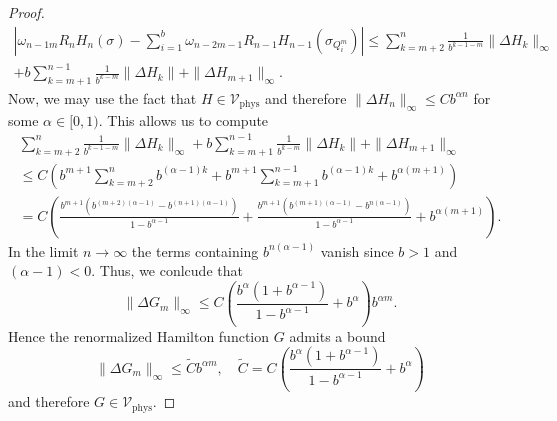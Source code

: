 \documentclass{article}
\newcommand{\phys}{\mathrm{phys}}
\begin{document}
\begin{proof}
    \begin{align}
        \left|\omega_{n-1m}R_nH_n(\sigma)-\sum_{i=1}^b\omega_{n-2m-1}R_{n-1}H_{n-1}(\sigma_{Q_i^m})\right|\leq\sum_{k=m+2}^n\frac{1}{b^{k-1-m}}\|\Delta H_k\|_\infty\nonumber\\+b\sum_{k=m+1}^{n-1}\frac{1}{b^{k-m}}\|\Delta H_k\|
        +\|\Delta H_{m+1}\|_\infty.
    \end{align}
    Now, we may use the fact that $H\in\mathcal{V}_\phys$ and therefore $\|\Delta H_n\|_\infty\leq Cb^{\alpha n}$ for some $\alpha\in[0,1)$. This allows us to compute
    \begin{align}
        \sum_{k=m+2}^n\frac{1}{b^{k-1-m}}\|\Delta H_k\|_\infty+b\sum_{k=m+1}^{n-1}\frac{1}{b^{k-m}}\|\Delta H_k\|
        +\|\Delta H_{m+1}\|_\infty\nonumber\\
        \leq C\left(b^{m+1}\sum_{k=m+2}^nb^{(\alpha-1)k}+b^{m+1}\sum_{k=m+1}^{n-1}b^{(\alpha-1)k}+b^{\alpha(m+1)}\right)\nonumber\\
        =C\left(\frac{b^{m+1}\left(b^{(m+2)(\alpha-1)}-b^{(n+1)(\alpha-1)}\right)}{1-b^{\alpha-1}}+\frac{b^{m+1}\left(b^{(m+1)(\alpha-1)}-b^{n(\alpha-1)}\right)}{1-b^{\alpha-1}}+b^{\alpha(m+1)}\right).
    \end{align}
    In the limit $n\to\infty$ the terms containing $b^{n(\alpha-1)}$ vanish since $b>1$ and $(\alpha-1)<0$. Thus, we conlcude that
    \begin{equation}
        \|\Delta G_m\|_\infty\leq C\left(\frac{b^\alpha(1+b^{\alpha-1})}{1-b^{\alpha-1}}+b^\alpha\right)b^{\alpha m}.
    \end{equation}
    Hence the renormalized Hamilton function $G$ admits a bound
    \begin{equation}
        \|\Delta G_m\|_\infty\leq\tilde Cb^{\alpha m},\quad\tilde C=C\left(\frac{b^\alpha(1+b^{\alpha-1})}{1-b^{\alpha-1}}+b^\alpha\right)
    \end{equation}
    and therefore $G\in \mathcal{V}_\phys$.
\end{proof}
\end{document}
